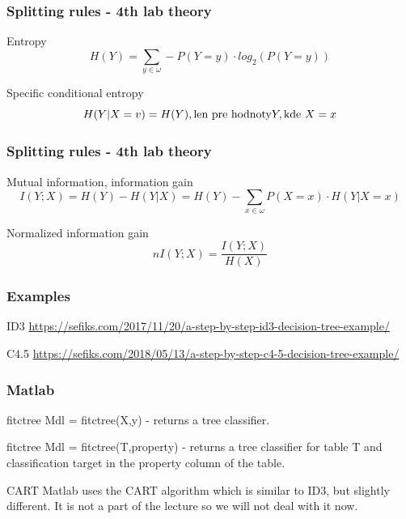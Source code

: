\documentclass{beamer}
\begin{document}
\begin{frame}
\frametitle{Splitting rules - 4th lab theory}

\begin{block}{Entropy}
$$H(Y) = \sum_{y \in \omega} - P(Y = y) \cdot log_2(P(Y=y))$$
\end{block}

\begin{block}{Specific conditional entropy}
$$H(Y| X = v) = H(Y), \textnormal{len pre hodnoty} Y, \textnormal{kde } X = x $$
\end{block}
\end{frame}


\begin{frame}
\frametitle{Splitting rules - 4th lab theory}
\begin{block}{Mutual information, information gain}
$$I(Y;X) = H(Y) - H(Y|X) = H(Y) - \sum_{x \in \omega} P(X = x)\cdot H(Y|X = x)$$
\end{block}

\begin{block}{Normalized information gain}
$$nI(Y;X) = \frac{I(Y;X)}{H(X)}$$
\end{block}
\end{frame}


\begin{frame}
\frametitle{Examples}

\begin{block}{ID3}
\url{https://sefiks.com/2017/11/20/a-step-by-step-id3-decision-tree-example/}
\end{block}

\begin{block}{C4.5}
\url{https://sefiks.com/2018/05/13/a-step-by-step-c4-5-decision-tree-example/}
\end{block}
\end{frame}


\begin{frame}
\frametitle{Matlab}
\begin{block}{fitctree}
Mdl = fitctree(X,y) - returns a tree classifier.
\end{block}

\begin{block}{fitctree}
Mdl = fitctree(T,property) - returns a tree classifier for table T and classification target in the property column of the table.
\end{block}

\begin{block}{CART}
Matlab uses the CART algorithm which is similar to ID3, but slightly different. It is not a part of the lecture so we will not deal with it now.
\end{block}
\end{frame}
\end{document}
